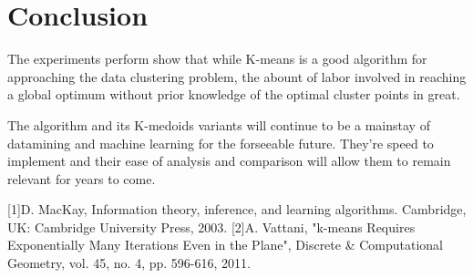 \documentclass[journal]{IEEEtran}
\begin{document}
\section{Conclusion}
The experiments perform show that while K-means is a good algorithm for approaching the data clustering problem, the abount of labor involved in reaching a global optimum without prior knowledge of the optimal cluster points in great.

The algorithm and its K-medoids variants will continue to be a mainstay of datamining and machine learning for the forseeable future. They're speed to implement and their ease of analysis and comparison will allow them to remain relevant for years to come.

\ifCLASSOPTIONcaptionsoff
  \newpage
\fi
\begin{thebibliography}{1}
	
	D. MacKay, Information theory, inference, and learning algorithms. Cambridge, UK: Cambridge University Press, 2003.
 [2]A.  Vattani, "k-means Requires Exponentially Many Iterations Even in the Plane", Discrete \& Computational Geometry, vol. 45, no. 4, pp. 596-616, 2011.
\end{thebibliography}



\end{document}
